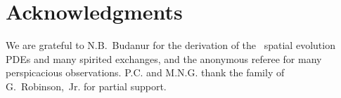 
\section*{Acknowledgments}

\PublicPrivate{}
              {
We are grateful to N.B.~Budanur for the derivation of
the \KS\ spatial evolution PDEs 
and many spirited exchanges,
and the anonymous referee
for many perspicacious observations.
              }
P.C. and M.N.G. thank the family of
G.~Robinson,~Jr. for partial support.
